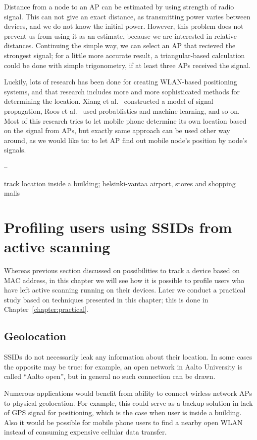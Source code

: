 \documentclass[12pt,a4paper,oneside,pdftex]{report}
\begin{document}
Distance from a node to an AP can be estimated by using strength of radio signal. This can not give an exact distance, as transmitting power varies between devices, and we do not know the initial power. However, this problem does not prevent us from using it as an estimate, because we are interested in relative distances. Continuing the simple way, we can select an AP that recieved the strongest signal; for a little more accurate result, a triangular-based calculation could be done with simple trigonometry, if at least three APs received the signal.

Luckily, lots of research has been done for creating WLAN-based positioning systems, and that research includes more and more sophisticated methods for determining the location. Xiang et al.~\cite{xiang2004} constructed a model of signal propagation, Roos et al.~\cite{roos2002} used probablistics and machine learning, and so on. Most of this research tries to let mobile phone determine its own location based on the signal from APs, but exactly same approach can be used other way around, as we would like to: to let AP find out mobile node's position by node's signals.

--

track location inside a building; helsinki-vantaa airport, stores and shopping malls

\section{Profiling users using SSIDs from active scanning}
\label{sec:ssid_profiling}

Whereas previous section discussed on possibilities to track a device based on MAC address, in this chapter we will see how it is possible to profile users who have left active scanning running on their devices. Later we conduct a practical study based on techniques presented in this chapter; this is done in Chapter~\ref{chapter:practical}. 

\subsection{Geolocation}
\label{subsec:ssid_geo}

SSIDs do not necessarily leak any information about their location. In some cases the opposite may be true: for example, an open network in Aalto University is called ``Aalto open'', but in general no such connection can be drawn.

Numerous applications would benefit from ability to connect wirless network APs to physical geolocation. For example, this could serve as a backup solution in lack of GPS signal for positioning, which is the case when user is inside a building. Also it would be possible for mobile phone users to find a nearby open WLAN instead of consuming expensive cellular data transfer.
\end{document}
